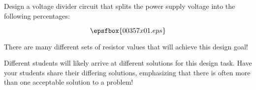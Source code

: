 

Design a voltage divider circuit that splits the power supply voltage into the following percentages:

$$\epsfbox{00357x01.eps}$$







There are many different sets of resistor values that will achieve this design goal!







Different students will likely arrive at different solutions for this design task.  Have your students share their differing solutions, emphasizing that there is often more than one acceptable solution to a problem!




